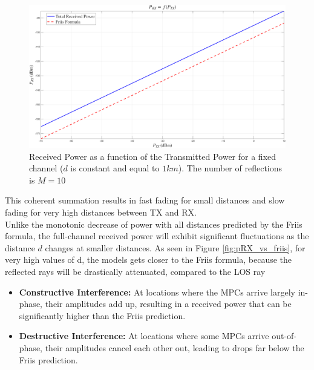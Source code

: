 \begin{figure}[H]
	\centering
	\includegraphics[width=1\linewidth]{content/4-images/PRX-vs-PTX}
	\caption{Received Power as a function of the Transmitted Power for a fixed channel ($d$ is constant and equal to $1km$). The number of reflections is $M=10$}
	\label{fig:prx-vs-ptx}
\end{figure}


This coherent summation results in fast fading for small distances and slow fading for very high distances between TX and RX. \\
Unlike the monotonic decrease of power with all distances predicted by the Friis formula, the full-channel received power will exhibit significant fluctuations as the distance $d$ changes at smaller distances. As seen in Figure \ref{fig:pRX_vs_friis}, for very high values of d, the models gets closer to the Friis formula, because the reflected rays will be drastically attenuated, compared to the LOS ray
\begin{itemize}
	\item \textbf{Constructive Interference:} At locations where the MPCs arrive largely in-phase, their amplitudes add up, resulting in a received power that can be significantly higher than the Friis prediction.
	\item \textbf{Destructive Interference:} At locations where some MPCs arrive out-of-phase, their amplitudes cancel each other out, leading to drops far below the Friis prediction.
\end{itemize}

